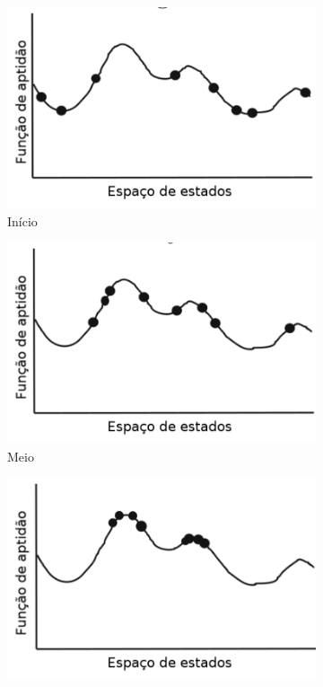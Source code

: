 \begin{figure}[htb!]
\centering
	\begin{subfigure}[b]{0.3\textwidth}
		\includegraphics[width=\textwidth]{fig/evolutionary-algorithms-function-start.pdf}
		\caption{Início}
		\label{fig:evolutionary-algorithms-function-start}
	\end{subfigure}
	\begin{subfigure}[b]{0.3\textwidth}
		\includegraphics[width=\textwidth]{fig/evolutionary-algorithms-function-middle.pdf}
		\caption{Meio}
		\label{fig:evolutionary-algorithms-function-middle}
	\end{subfigure}
	\begin{subfigure}[b]{0.3\textwidth}
		\includegraphics[width=\textwidth]{fig/evolutionary-algorithms-function-end.pdf}

\end{subfigure}
\end{figure}
